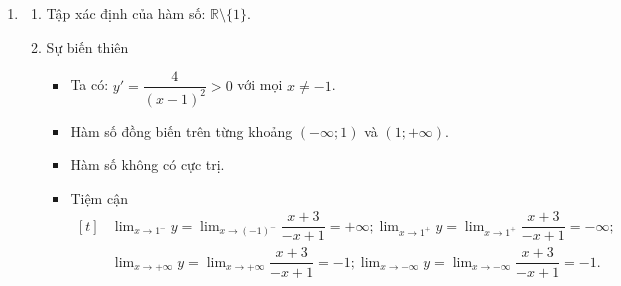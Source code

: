 \begin{bt}
{\begin{enumerate}
\begin{enumerate}
{\begin{tikzpicture}[line cap=round, line join=round,font=\footnotesize,>=stealth, scale=1,x=0.5cm, y=0.5cm]
					\end{tikzpicture}
				}
			\end{enumerate}
			\item \begin{enumerate}
				\item Tập xác định của hàm số: $\mathbb{R} \setminus\{1\}$.	
				\item Sự biến thiên
				\begin{itemize}
					\item Ta có: $y'=\dfrac{4}{(x-1)^{2}}>0$ với mọi $x \neq -1$.
					\item Hàm số đồng biến trên từng khoảng $(-\infty ; 1)$ và $(1 ;+\infty)$.
					\item Hàm số không có cực trị.
					\item Tiệm cận
					$\begin{aligned}[t]
						&\lim _{x \rightarrow 1^{-}} y=\lim _{x \rightarrow (-1)^{-}} \dfrac{x+3}{-x+1}=+\infty ; \lim _{x \rightarrow 1^{+}} y=\lim _{x \rightarrow 1^{+}} \dfrac{x+3}{-x+1}=-\infty;\\
						&\lim _{x \rightarrow+\infty} y=\lim _{x \rightarrow+\infty} \dfrac{x+3}{-x+1}=-1 ; \lim _{x \rightarrow-\infty} y=\lim _{x \rightarrow-\infty} \dfrac{x+3}{-x+1}=-1.
					\end{aligned}
					$
					

\end{itemize}
\end{enumerate}
\end{enumerate}}
\end{bt}
